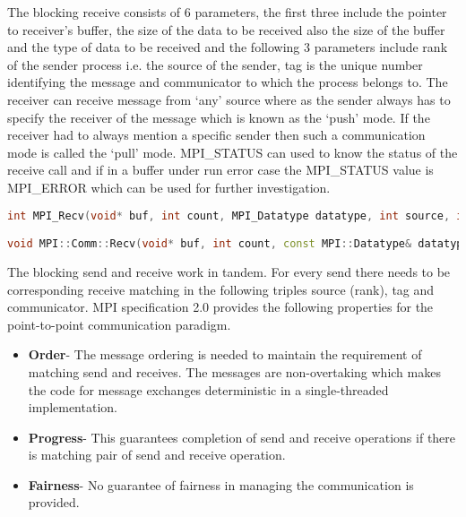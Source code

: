 The blocking receive consists of 6 parameters, the first three include the pointer to receiver's buffer, the size of the data to be received also the size of the buffer and the type of data to be received and the following 3 parameters include rank of the sender process i.e. the source of the sender, tag is the unique number identifying the message and communicator to which the process belongs to.  The receiver can receive message from {\lq}any{\rq} source where as the sender always has to specify the receiver of the message which is known as the {\lq}push{\rq} mode. If the receiver had to always mention a specific sender then such a communication mode is called the {\lq}pull{\rq} mode. MPI\_STATUS can used to know the status of the receive call and if in a buffer under run error case the MPI\_STATUS value is MPI\_ERROR which can be used for further investigation. 

\begin{lstlisting}[language=C++,label={lst:mpiReceive},caption={Blocking MPI Receive}]
int MPI_Recv(void* buf, int count, MPI_Datatype datatype, int source, int tag, MPI_Comm comm, MPI_Status *status)

void MPI::Comm::Recv(void* buf, int count, const MPI::Datatype& datatype, int source, int tag, MPI::Status& status)
\end{lstlisting}

The blocking send and receive work in tandem. For every send there needs to be corresponding receive matching in the following triples  source (rank), tag and communicator. MPI specification 2.0 provides the following properties for the point-to-point communication paradigm. 

\begin{itemize}
\item \textbf{Order}- The message ordering is needed to maintain the requirement of matching send and receives. The messages are non-overtaking which makes the code for message exchanges deterministic in a single-threaded implementation. 
\item \textbf{Progress}- This guarantees completion of send and receive operations if there is matching pair of send and receive operation.  
\item \textbf{Fairness}- No guarantee of fairness in managing the communication is provided.  
\end{itemize} 

